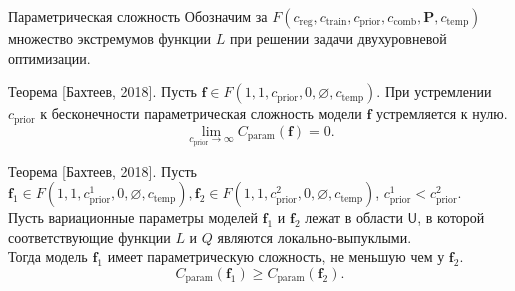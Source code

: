 \documentclass[usenames,dvipsnames,11pt,pdf,utf8,russian,aspectratio=43]{beamer}
\begin{document}
\begin{frame}{Параметрическая сложность}
\small
Обозначим за $F(c_{\text{reg}}, c_{\text{train}}, c_{\text{prior}}, c_{\text{comb}}, \mathbf{P}, c_{\text{temp}})$ множество экстремумов функции $L$ при решении задачи двухуровневой оптимизации.
\begin{block}{Теорема [Бахтеев, 2018].}
Пусть $\mathbf{f} \in F(1, 1, c_{\text{prior}}, 0, \varnothing,  c_{\text{temp}} )$.
При устремлении $ c_{\text{prior}}$ к бесконечности параметрическая сложность модели $\mathbf{f}$ устремляется к нулю.
\[
    \lim_{c_{\text{prior}} \to \infty} C_{\text{param}}(\mathbf{f}) = 0.
\]
\end{block}

\begin{block}{Теорема [Бахтеев, 2018].}
Пусть $\mathbf{f}_1 \in F(1, 1, c_{\text{prior}}^1, 0, \varnothing,  c_{\text{temp}} ), \mathbf{f}_2 \in F(1, 1, c_{\text{prior}}^2, 0, \varnothing,  c_{\text{temp}})$, $c_{\text{prior}}^1 < c_{\text{prior}}^2$.\\
Пусть вариационные параметры моделей $\mathbf{f}_1$ и $\mathbf{f}_2$ лежат в области $\mathsf{U}$, в которой соответствующие функции $L$ и $Q$ являются локально-выпуклыми.\\ 
Тогда модель $\mathbf{f}_1$ имеет параметрическую сложность, не меньшую чем у $\mathbf{f}_2$.
\[
    C_\text{param}(\mathbf{f}_1) \geq C_\text{param}(\mathbf{f}_2).
\]
\end{block}


\end{frame}
\end{document}
